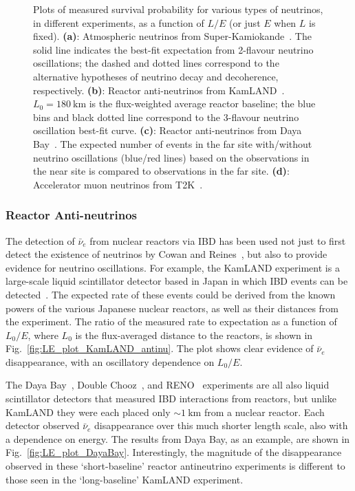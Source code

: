 \begin{figure}
    {Plots of measured survival probability for various types of neutrinos, in different experiments, as a function of $L/E$ (or just $E$ when $L$ is fixed). \textbf{(a)}: Atmospheric neutrinos from Super-Kamiokande~\cite{ashieEvidenceOscillatorySignature2004}. The solid line indicates the best-fit expectation from 2-flavour neutrino oscillations; the dashed and dotted lines correspond to the alternative hypotheses of neutrino decay and decoherence, respectively. \textbf{(b)}: Reactor anti-neutrinos from KamLAND~\cite{gandoReactorOnoffAntineutrino2013}. $L_{0} = \SI{180}{\km}$ is the flux-weighted average reactor baseline; the blue bins and black dotted line correspond to the 3-flavour neutrino oscillation best-fit curve. \textbf{(c)}: Reactor anti-neutrinos from Daya Bay~\cite{adeyMeasurementElectronAntineutrino2018}. The expected number of events in the far site with/without neutrino oscillations (blue/red lines) based on the observations in the near site is compared to observations in the far site. \textbf{(d)}: Accelerator muon neutrinos from T2K~\cite{abeImprovedConstraintsNeutrino2021}.}
    \label{fig:LE_plots}
\end{figure}

\subsubsection{Reactor Anti-neutrinos}
The detection of $\bar{\nu}_{e}$ from nuclear reactors via IBD has been used not just to first detect the existence of neutrinos by Cowan and Reines~\cite{cowanDetectionFreeNeutrino1956,reinesNeutrino1956}, but also to provide evidence for neutrino oscillations. For example, the KamLAND experiment is a large-scale liquid scintillator detector based in Japan in which IBD events can be detected~\cite{gandoReactorOnoffAntineutrino2013}. %
The expected rate of these events could be derived from the known powers of the various Japanese nuclear reactors, as well as their distances from the experiment. The ratio of the measured rate to expectation as a function of $L_{0}/E$, where $L_{0}$ is the flux-averaged distance to the reactors, is shown in Fig.~\ref{fig:LE_plot_KamLAND_antinu}. The plot shows clear evidence of $\bar{\nu}_{e}$ disappearance, with an oscillatory dependence on $L_{0}/E$.

The Daya Bay~\cite{adeyMeasurementElectronAntineutrino2018}, Double Chooz~\cite{dekerretDoubleChoozTh132020}, and RENO~\cite{bakMeasurementReactorAntineutrino2018} experiments are all also liquid scintillator detectors that measured IBD interactions from reactors, but unlike KamLAND they were each placed only $\sim\SI{1}{\km}$ from a nuclear reactor. Each detector observed $\bar{\nu}_{e}$ disappearance over this much shorter length scale, also with a dependence on energy. The results from Daya Bay, as an example, are shown in Fig.~\ref{fig:LE_plot_DayaBay}. Interestingly, the magnitude of the disappearance observed in these `short-baseline' reactor antineutrino experiments is different to those seen in the `long-baseline' KamLAND experiment.

